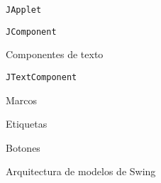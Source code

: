 \begin{longenum}
\begin{longenum}
\begin{longenum}
            \item \texttt{JApplet}
        \end{longenum}
        \item \texttt{JComponent}
        \item Componentes de texto
        \begin{longenum}
            \item \texttt{JTextComponent}
        \end{longenum}
        \item Marcos
        \item Etiquetas
        \item Botones
        \item Arquitectura de modelos de Swing
    \end{longenum}
\end{longenum}
